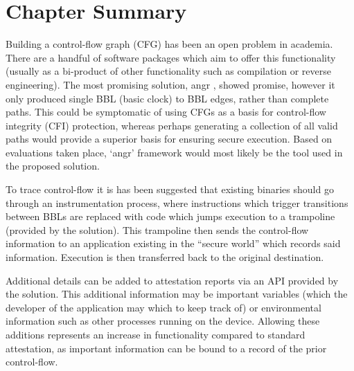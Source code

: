 \section{Chapter Summary}
Building a control-flow graph (CFG) has been an open problem in academia. There are a handful of software packages which aim to offer this functionality (usually as a bi-product of other functionality such as compilation or reverse engineering). The most promising solution, angr \cite{Shoshitaishvili2016}, showed promise, however it only produced single BBL (basic clock) to BBL edges, rather than complete paths. This could be symptomatic of using CFGs as a basis for control-flow integrity (CFI) protection, whereas perhaps generating a collection of all valid paths would provide a superior basis for ensuring secure execution. Based on evaluations taken place, `angr' framework would most likely be the tool used in the proposed solution.

To trace control-flow it is has been suggested that existing binaries should go through an instrumentation process, where instructions which trigger transitions between BBLs are replaced with code which jumps execution to a trampoline (provided by the solution). This trampoline then sends the control-flow information to an application existing in the ``secure world'' which records said information. Execution is then transferred back to the original destination.

Additional details can be added to attestation reports via an API provided by the solution. This additional information may be important variables (which the developer of the application may which to keep track of) or environmental information such as other processes running on the device. Allowing these additions represents an increase in functionality compared to standard attestation, as important information can be bound to a record of the prior control-flow.